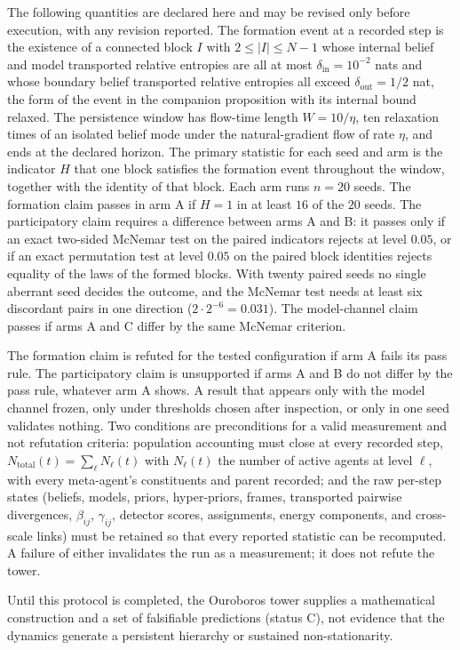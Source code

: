 The following quantities are declared here and may be revised only before execution, with any revision reported. The formation event at a recorded step is the existence of a connected block $I$ with $2 \le |I| \le N-1$ whose internal belief and model transported relative entropies are all at most $\delta_{\mathrm{in}} = 10^{-2}$ nats and whose boundary belief transported relative entropies all exceed $\delta_{\mathrm{out}} = 1/2$ nat, the form of the event in the companion proposition with its internal bound relaxed. The persistence window has flow-time length $W = 10/\eta$, ten relaxation times of an isolated belief mode under the natural-gradient flow of rate $\eta$, and ends at the declared horizon. The primary statistic for each seed and arm is the indicator $H$ that one block satisfies the formation event throughout the window, together with the identity of that block. Each arm runs $n = 20$ seeds. The formation claim passes in arm A if $H = 1$ in at least $16$ of the $20$ seeds. The participatory claim requires a difference between arms A and B: it passes only if an exact two-sided McNemar test on the paired indicators rejects at level $0.05$, or if an exact permutation test at level $0.05$ on the paired block identities rejects equality of the laws of the formed blocks. With twenty paired seeds no single aberrant seed decides the outcome, and the McNemar test needs at least six discordant pairs in one direction ($2 \cdot 2^{-6} = 0.031$). The model-channel claim passes if arms A and C differ by the same McNemar criterion.

The formation claim is refuted for the tested configuration if arm A fails its pass rule. The participatory claim is unsupported if arms A and B do not differ by the pass rule, whatever arm A shows. A result that appears only with the model channel frozen, only under thresholds chosen after inspection, or only in one seed validates nothing. Two conditions are preconditions for a valid measurement and not refutation criteria: population accounting must close at every recorded step, $N_{\mathrm{total}}(t) = \sum_\ell N_\ell(t)$ with $N_\ell(t)$ the number of active agents at level $\ell$, with every meta-agent's constituents and parent recorded; and the raw per-step states (beliefs, models, priors, hyper-priors, frames, transported pairwise divergences, $\beta_{ij}$, $\gamma_{ij}$, detector scores, assignments, energy components, and cross-scale links) must be retained so that every reported statistic can be recomputed. A failure of either invalidates the run as a measurement; it does not refute the tower.

Until this protocol is completed, the Ouroboros tower supplies a mathematical construction and a set of falsifiable predictions (status C), not evidence that the dynamics generate a persistent hierarchy or sustained non-stationarity.

